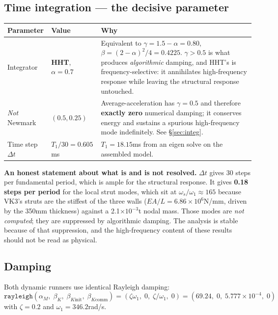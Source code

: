 \documentclass[11pt,a4paper]{article}
\begin{document}
\subsection{Time integration --- the decisive parameter}

\begin{tabularx}{\textwidth}{@{}p{40mm}p{34mm}>{\raggedright\arraybackslash}X@{}}
\toprule
\textbf{Parameter} & \textbf{Value} & \textbf{Why} \\
\midrule
Integrator & \textbf{HHT}, $\alpha=0.7$ & Equivalent to $\gamma=1.5-\alpha=0.80$, $\beta=(2-\alpha)^2/4=0.4225$. $\gamma>0.5$ is what produces \emph{algorithmic} damping, and HHT's is frequency-selective: it annihilates high-frequency response while leaving the structural response untouched. \\
\emph{Not} Newmark & $(0.5,0.25)$ & Average-acceleration has $\gamma=0.5$ and therefore \textbf{exactly zero} numerical damping; it conserves energy and sustains a spurious high-frequency mode indefinitely. See \S\ref{sec:integ}. \\
Time step $\Delta t$ & $T_1/30 = 0.605$\unit{ms} & $T_1=18.15$\unit{ms} from an eigen solve on the assembled model. \\
\bottomrule
\end{tabularx}

\medskip
\textbf{An honest statement about what is and is not resolved.} $\Delta t$ gives 30 steps per
fundamental period, which is ample for the structural response. It gives \textbf{0.18 steps per
period} for the local strut modes, which sit at $\omega_s/\omega_1\approx165$ because VK3's struts
are the stiffest of the three walls ($EA/L=6.86\times10^6$\unit{N/mm}, driven by the 350\unit{mm}
thickness) against a 2.1$\times10^{-3}$\unit{t} nodal mass. Those modes are \emph{not computed};
they are suppressed by algorithmic damping. The analysis is stable because of that suppression, and
the high-frequency content of these results should not be read as physical.

\subsection{Damping}

Both dynamic runners use identical Rayleigh damping:
\[
\texttt{rayleigh}(\alpha_M,\;\beta_K,\;\beta_{K\text{init}},\;\beta_{K\text{comm}})
= (\zeta\omega_1,\; 0,\; \zeta/\omega_1,\; 0)
= (69.24,\; 0,\; 5.777\times10^{-4},\; 0)
\]
with $\zeta=0.2$ and $\omega_1=346.2$\unit{rad/s}.
\end{document}
